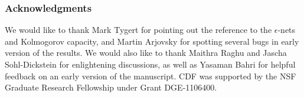 \documentclass{article} %
\begin{document}
\subsubsection*{Acknowledgments}

We would like to thank Mark Tygert for pointing out 
the reference to the $\epsilon$-nets and Kolmogorov capacity, and Martin Arjovsky for spotting 
several bugs in early version of the results. 
 We would also like to thank Maithra Raghu and Jascha Sohl-Dickstein for enlightening discussions, as well as Yasaman Bahri for helpful feedback on an early version of the manuscript.  CDF was supported by the NSF Graduate Research Fellowship under Grant DGE-1106400.
 




\appendix




\end{document}
